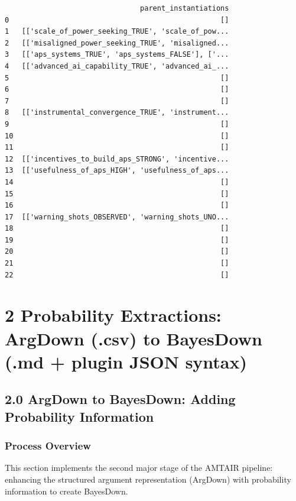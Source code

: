 \documentclass[
  11pt,
  letterpaper,
]{book}
\begin{document}
\begin{verbatim}
                                parent_instantiations  
0                                                  []  
1   [['scale_of_power_seeking_TRUE', 'scale_of_pow...  
2   [['misaligned_power_seeking_TRUE', 'misaligned...  
3   [['aps_systems_TRUE', 'aps_systems_FALSE'], ['...  
4   [['advanced_ai_capability_TRUE', 'advanced_ai_...  
5                                                  []  
6                                                  []  
7                                                  []  
8   [['instrumental_convergence_TRUE', 'instrument...  
9                                                  []  
10                                                 []  
11                                                 []  
12  [['incentives_to_build_aps_STRONG', 'incentive...  
13  [['usefulness_of_aps_HIGH', 'usefulness_of_aps...  
14                                                 []  
15                                                 []  
16                                                 []  
17  [['warning_shots_OBSERVED', 'warning_shots_UNO...  
18                                                 []  
19                                                 []  
20                                                 []  
21                                                 []  
22                                                 []  
\end{verbatim}

\chapter{2 Probability Extractions: ArgDown (.csv) to BayesDown (.md +
plugin JSON
syntax)}\label{probability-extractions-argdown-.csv-to-bayesdown-.md-plugin-json-syntax}

\section{2.0 ArgDown to BayesDown: Adding Probability
Information}\label{argdown-to-bayesdown-adding-probability-information}

\subsection{Process Overview}\label{process-overview-1}

This section implements the second major stage of the AMTAIR pipeline:
enhancing the structured argument representation (ArgDown) with
probability information to create BayesDown.
\end{document}
